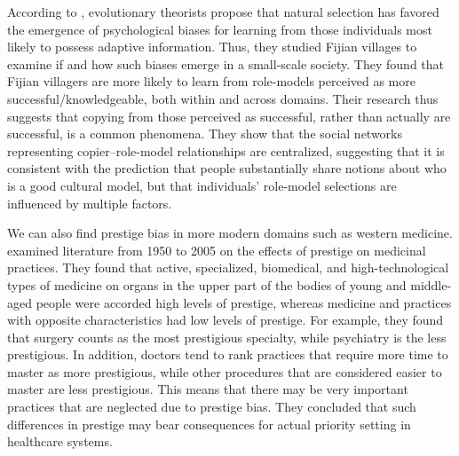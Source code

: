 \documentclass[12pt]{extarticle}
\begin{document}
According to \citet{fijian_social_bias}, evolutionary theorists propose that natural selection has favored the emergence of psychological biases for learning from those individuals most likely to possess adaptive information. 
Thus, they studied Fijian villages to examine if and how such biases emerge in a small-scale society.
They found that Fijian villagers are more likely to learn from role-models perceived as more successful/knowledgeable, both within and across domains.
Their research thus suggests that copying from those perceived as successful, rather than actually are successful, is a common phenomena. 
They show that the social networks representing copier--role-model relationships are centralized, suggesting that it is consistent with the prediction that people substantially share notions about who is a good cultural model, but that individuals' role-model selections are influenced by multiple factors.

We can also find prestige bias in more modern domains such as western medicine.
\citet{medical_prestige} examined literature from 1950 to 2005 on the effects of prestige on medicinal practices. They found that active, specialized, biomedical, and high-technological types of medicine on organs in the upper part of the bodies of young and middle-aged people were accorded high levels of prestige, whereas medicine and practices with opposite characteristics had low levels of prestige. 
For example, they found that surgery counts as the most prestigious specialty, while psychiatry is the less prestigious.
In addition, doctors tend to rank practices that require more time to master as more prestigious, while other procedures that are considered easier to master are less prestigious. 
This means that there may be very important practices that are neglected due to prestige bias.
They concluded that such differences in prestige may bear consequences for actual priority setting in healthcare systems.
\end{document}
